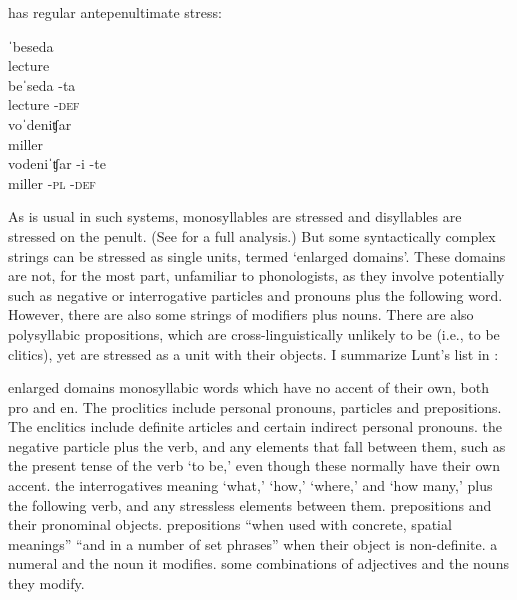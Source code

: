 \documentclass[output=paper,
modfonts
]{LSP/langsci}
\begin{document}
\begin{exe}
 has regular antepenultimate stress:

\ea \label{ex:kaisse:17}  \citep{lunt1952,franks1987,franks1989}
	\ea \label{ex:kaisse:17a} \gll  ˈbeseda\\
	lecture\\
	
	\ex \label{ex:kaisse:17b} \gll beˈseda \squish-ta\\
	lecture \squish-\textsc{def}\\
	
	\ex \label{ex:kaisse:17c} \gll voˈdeniʧar\\
	miller\\
	
	\ex \label{ex:kaisse:17d} \gll vodeniˈʧar \squish-i \squish-te\\
	miller \squish-\textsc{pl} \squish\textsc{-def}\\
	\z
\z

\noindent As is usual in such systems, monosyllables are stressed and disyllables are stressed on the penult. (See \citealt[53]{halle1987} for a full analysis.) But some syntactically complex strings can be stressed as single units, termed ‘enlarged  domains’. These domains are not, for the most part, unfamiliar to phonologists, as they involve potentially   such as negative or interrogative particles and pronouns plus the following word. However, there are also some\textit{} strings of modifiers plus nouns. There are also polysyllabic propositions, which are cross-linguistically unlikely to be  (i.e., to be clitics), yet are stressed as a unit with their objects. I summarize Lunt’s list in :

\ea \label{ex:kaisse:18}  enlarged domains \citep[23--25]{lunt1952}
	\ea \label{ex:kaisse:18a} monosyllabic words which have no accent of their own, both pro and en. The proclitics include personal pronouns, particles and prepositions. The enclitics include definite articles and certain indirect personal pronouns.
	\ex \label{ex:kaisse:18b} the negative particle plus the verb, and any elements that fall between them, such as the present tense of the verb ‘to be,’ even though these normally have their own accent. 
	\ex \label{ex:kaisse:18c} the interrogatives meaning `what,' `how,' `where,' and `how many,' plus the following verb, and any stressless elements between them.
	\ex \label{ex:kaisse:18d} prepositions and their pronominal objects.
	\ex \label{ex:kaisse:18e} prepositions “when used with concrete, spatial meanings” “and in a number of set phrases” when their object is non-definite.
	\ex \label{ex:kaisse:18f} a numeral and the noun it modifies.
	\ex \label{ex:kaisse:18g} some combinations of adjectives and the nouns they modify.
	\z
\z


\end{exe}
\end{document}
